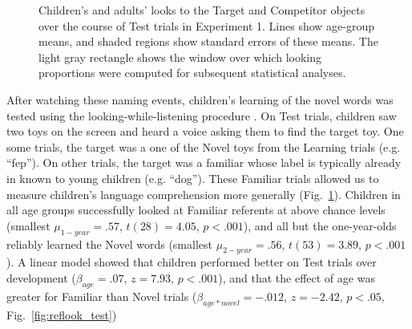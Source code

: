 \documentclass{pnastwo}
\begin{document}
\begin{article}
\begin{figure}[tb]
	\caption{Children's and adults' looks to the Target and Competitor objects over the course of Test trials in Experiment 1. Lines show age-group means, and shaded regions show standard errors of these means. The light gray rectangle shows the window over which looking proportions were computed for subsequent statistical analyses.}
	\label{fig:reflook_timecourse}
\end{figure}


After watching these naming events, children's learning of the novel words was tested using the looking-while-listening procedure \cite{fernald1998, fernald2008}. On Test trials, children saw two toys on the screen and heard a voice asking them to find the target toy. One some trials, the target was a one of the Novel toys from the Learning trials (e.g. ``fep''). On other trials, the target was a familiar whose label is typically already in known to young children (e.g. ``dog''). These Familiar trials allowed us to measure children's language comprehension more generally (Fig.~\ref{fig:reflook_timecourse}). Children in all age groups successfully looked at Familiar referents at above chance levels (smallest $\mu_{1-year} = .57$, $t(28) = 4.05$, $p < .001$), and all but the one-year-olds reliably learned the Novel words (smallest $\mu_{2-year} = .56$, $t(53) = 3.89$, $p < .001$). A linear model showed that children performed better on Test trials over development ($\beta_{age} = .07$, $z = 7.93$, $p < .001$), and that the effect of age was greater for Familiar than Novel trials ($\beta_{age * novel} = -.012$, $z = -2.42$, $p < .05$, Fig.~\ref{fig:reflook_test})


\end{article}
\end{document}
